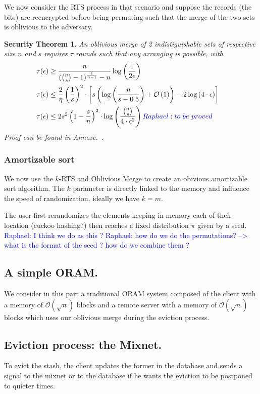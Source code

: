 \documentclass[conference]{IEEEtran}
\newtheorem{secthm}{Security Theorem}
\newcommand{\raphael}[1]{\textcolor{blue}{Raphael: #1}}
\begin{document}
We now consider the RTS process in that scenario and suppose the records (the bits) are reencrypted before being permuting such that the merge of the two sets is oblivious to the adversary.

\begin{secthm}
An oblivious merge of 2 indistiguishable sets of respective size $n$ and $s$ requires $\tau$ rounds such that any arranging is possible, with
\begin{align*}
\tau(\epsilon) &\geq \frac{n}{({n \choose s}-1)^{\frac{1}{n-1}}-n} \log\left(\frac{1}{2 \epsilon} \right) &\\
\tau(\epsilon) &\leq \frac{2}{\eta} \left (\frac{1}{s} \right )^2 \cdot \left [ s \left( \log \left (\frac{n}{s-0.5}\right) +\mathcal{O}\left(1\right) \right ) - 2\log \left( 4 \cdot \epsilon\right) \right ] &\\
\tau(\epsilon) &\leq 2 s^2 \left(1- \frac{s}{n} \right )^2 \cdot \log \left(\frac{{n \choose s}}{4\cdot\epsilon^2}\right) \raphael{to\ be\ proved}
\end{align*}
Proof can be found in Annexe.~\cite{}.
\end{secthm}

\subsubsection{Amortizable sort}

We now use the $k$-RTS and Oblivious Merge to create an obivious amortizable sort algorithm. The $k$ parameter is directly linked to the memory and influence the speed of randomization, ideally we have $k=m$.

The user first rerandomizes the elements keeping in memory each of their location (cuckoo hashing?) then reaches a fixed distribution $\pi$ given by a seed.
\raphael{I think we do as this ?}
\raphael{how do we do the permutations? --> what is the format of the seed ? how do we combine them ?}

\subsection{A simple ORAM.}
We consider in this part a traditional ORAM system composed of the client with a memory of $\mathcal{O}\left(\sqrt{n}\right)$ blocks and a remote server with a memory of $\mathcal{O}\left(\sqrt{n}\right)$ blocks which uses our oblivious merge during the eviction process.


\subsection{Eviction process: the Mixnet.}
To evict the stash, the client updates the former in the database and sends a signal to the mixnet or to the database if he wants the eviction to be postponed to quieter times.
\end{document}
